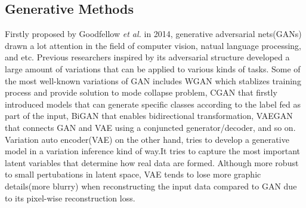 \documentclass[letterpaper]{article}
\begin{document}
\subsection{Generative Methods}
Firstly proposed by Goodfellow \emph{et al.} in 2014, generative adversarial nets(GANs) \cite{goodfellow2014generative} drawn a lot attention in the field of computer vision, natual language processing, and etc. Previous researchers inspired by its adversarial structure developed a large amount of variations that can be applied to various kinds of tasks. Some of the most well-known variations of GAN includes WGAN\cite{arjovsky2017wasserstein} which stablizes training process and provide solution to mode collapse problem, CGAN\cite{mirza2014conditional} that firstly introduced models that can generate specific classes according to the label fed as part of the input, BiGAN\cite{donahue2016adversarial} that enables bidirectional transformation, VAEGAN\cite{larsen2015autoencoding} that connects GAN and VAE using a conjuncted generator/decoder, and so on. Variation auto encoder(VAE) on the other hand, tries to develop a generative model in a variation inference kind of way\cite{kingma2013auto}.It tries to capture the most important latent variables that determine how real data are formed. Although more robust to small pertubations in latent space, VAE tends to lose more graphic details(more blurry) when reconstructing the input data compared to GAN due to its pixel-wise reconstruction loss. 
\end{document}
